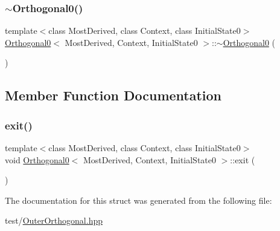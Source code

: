 \mbox{\label{struct_orthogonal0_aab4e3aba86830abb33ffe13a41ef6740}} 
\subsubsection{\texorpdfstring{$\sim$\+Orthogonal0()}{~Orthogonal0()}}
{\footnotesize\ttfamily template$<$class Most\+Derived, class Context, class Initial\+State0$>$ \\
\mbox{\hyperlink{struct_orthogonal0}{Orthogonal0}}$<$ Most\+Derived, Context, Initial\+State0 $>$\+::$\sim$\mbox{\hyperlink{struct_orthogonal0}{Orthogonal0}} (\begin{DoxyParamCaption}{ }\end{DoxyParamCaption})\hspace{0.3cm}{\ttfamily [inline]}}



\subsection{Member Function Documentation}
\mbox{\label{struct_orthogonal0_a3aaddfeb2c0fd79d819663cf36d257c6}} 
\subsubsection{\texorpdfstring{exit()}{exit()}}
{\footnotesize\ttfamily template$<$class Most\+Derived, class Context, class Initial\+State0$>$ \\
void \mbox{\hyperlink{struct_orthogonal0}{Orthogonal0}}$<$ Most\+Derived, Context, Initial\+State0 $>$\+::exit (\begin{DoxyParamCaption}{ }\end{DoxyParamCaption})\hspace{0.3cm}{\ttfamily [inline]}}



The documentation for this struct was generated from the following file\+:\begin{DoxyCompactItemize}
\item 
test/\mbox{\hyperlink{_outer_orthogonal_8hpp}{Outer\+Orthogonal.\+hpp}}\end{DoxyCompactItemize}
